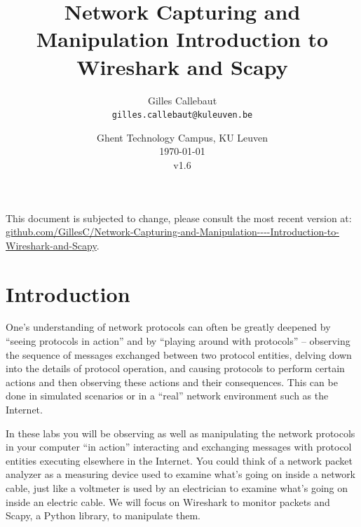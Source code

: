 \documentclass[11pt,a4paper]{article}
\title{Network Capturing and Manipulation Introduction to Wireshark and Scapy}
\author{Gilles Callebaut\\ \texttt{gilles.callebaut@kuleuven.be}}
\date{Ghent Technology Campus, KU Leuven\\ \today \\v1.6}
\begin{document}
 \sloppy

\maketitle

\begin{versionhistory}
\end{versionhistory}

\vfill
{\footnotesize
This document is subjected to change, please consult the most recent version at: \url{github.com/GillesC/Network-Capturing-and-Manipulation----Introduction-to-Wireshark-and-Scapy}.
}


\clearpage

\setcounter{tocdepth}{2}
\tableofcontents
\clearpage

\section{Introduction}
One's understanding of network protocols can often be greatly deepened by ``seeing
protocols in action'' and by ``playing around with protocols'' – observing the sequence of messages exchanged between two protocol entities, delving down into the details of protocol operation, and causing protocols to perform certain actions and then observing these actions and their consequences. This can be done in simulated scenarios or in a ``real'' network environment such as the Internet. 

In these labs you will be observing as well as manipulating the network protocols in your computer ``in action'' interacting and exchanging messages with protocol entities executing elsewhere in the Internet. 
You could think of a network packet analyzer as a measuring device used to examine what's going on inside a network cable, just like a voltmeter is used by an electrician to examine what's going on inside an electric cable. We will focus on Wireshark to monitor packets and Scapy, a Python library, to manipulate them. 
\end{document}
